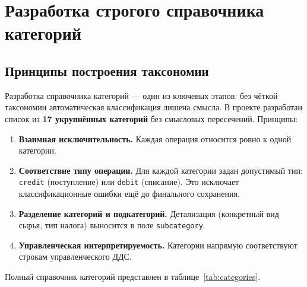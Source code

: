 \section{Разработка строгого справочника категорий}

\subsection{Принципы построения таксономии}

Разработка справочника категорий --- один из ключевых этапов: без чёткой таксономии автоматическая классификация лишена смысла. В проекте разработан список из \textbf{17 укрупнённых категорий} без смысловых пересечений. Принципы:

\begin{enumerate}
  \item \textbf{Взаимная исключительность.} Каждая операция относится ровно к одной категории.
  \item \textbf{Соответствие типу операции.} Для каждой категории задан допустимый тип: \texttt{credit} (поступление) или \texttt{debit} (списание). Это исключает классификационные ошибки ещё до финального сохранения.
  \item \textbf{Разделение категорий и подкатегорий.} Детализация (конкретный вид сырья, тип налога) выносится в поле \texttt{subcategory}.
  \item \textbf{Управленческая интерпретируемость.} Категории напрямую соответствуют строкам управленческого ДДС.
\end{enumerate}

Полный справочник категорий представлен в таблице~\ref{tab:categories}.

